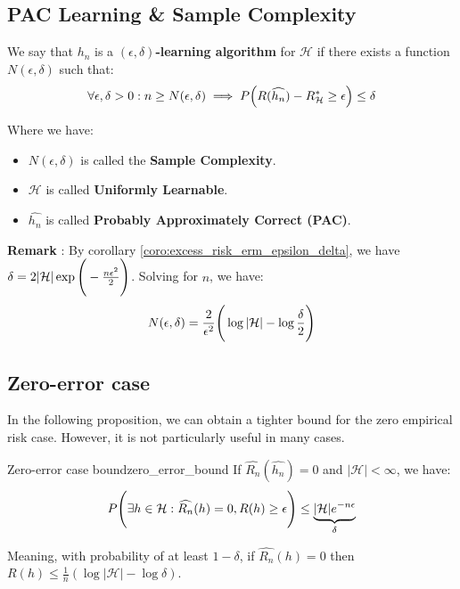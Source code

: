 \subsection{PAC Learning \& Sample Complexity}
\begin{definition}
    We say that $\widehat{h_n}$ is a \textbf{$(\epsilon, \delta)$-learning algorithm} for $\mathcal{H}$ if there exists a function $N(\epsilon, \delta)$ such that: 
    \begin{align*}
        \forall \epsilon, \delta > 0 : n \ge N(\epsilon, \delta) \implies 
        P\Big( R(\widehat{h_n}) - R_\mathcal{H}^* \ge \epsilon \Big) \le \delta
    \end{align*}   

    \noindent Where we have:
    \begin{itemize}
        \item $N(\epsilon, \delta)$ is called the \textbf{Sample Complexity}.
        \item $\mathcal{H}$ is called \textbf{Uniformly Learnable}.
        \item $\widehat{h_n}$ is called \textbf{Probably Approximately Correct (PAC)}.
    \end{itemize}
\end{definition}
\textbf{Remark} : By corollary \ref{coro:excess_risk_erm_epsilon_delta}, we have $\delta = 2|\mathcal{H}|\exp\Bigg( -\frac{n\epsilon^2}{2} \Bigg)$. Solving for $n$, we have:
\begin{align*}
    N(\epsilon, \delta) = \frac{2}{\epsilon^2}\Bigg( 
        \log|\mathcal{H}| - \log\frac{\delta}{2}
     \Bigg)
\end{align*}



\subsection{Zero-error case}
In the following proposition, we can obtain a tighter bound for the zero empirical risk case. However, it is not particularly useful in many cases.

\begin{proposition}{Zero-error case bound}{zero_error_bound}
    If $\widehat{R_n}(\widehat{h_n})=0$ and $|\mathcal{H}| < \infty$, we have:
    \begin{align*}
        P\Bigg( 
            \exists h \in \mathcal{H} : \widehat{R_n}(h) = 0, R(h)\ge\epsilon
         \Bigg) \le \underbrace{|\mathcal{H}|e^{-n\epsilon}}_{\delta}
    \end{align*}

    \noindent Meaning, with probability of at least $1-\delta$, if $\widehat{R_n}(h)=0$ then $R(h)\le \frac{1}{n}(\log|\mathcal{H}| - \log\delta)$.
\end{proposition}

